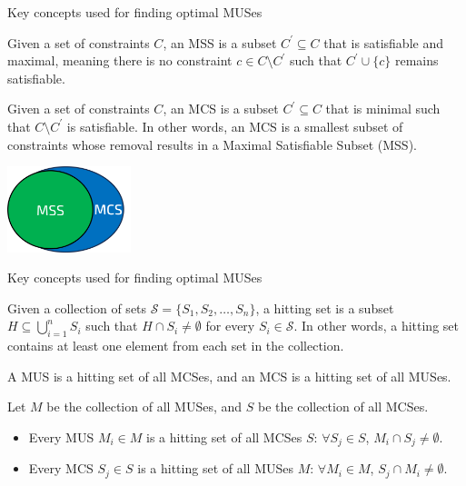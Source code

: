 \documentclass{cons-beamer}
\begin{document}
\begin{frame}{Key concepts used for finding optimal MUSes}

  \begin{definition}
    Given a set of constraints $C$, an MSS is a subset $C^{\prime} \subseteq C$ that is satisfiable and maximal, meaning there is no constraint $c \in C \setminus C^{\prime}$ such that $C^{\prime} \cup \{c\}$ remains satisfiable.
  \end{definition}
  \vfill

  \begin{definition}
    Given a set of constraints $C$, an MCS is a subset $C^{\prime} \subseteq C$ that is minimal such that $C \setminus C^{\prime}$ is satisfiable. In other words, an MCS is a smallest subset of constraints whose removal results in a Maximal Satisfiable Subset (MSS).
  \end{definition}
  \vfill

  \begin{center}
    \includegraphics[height=25mm]{images/texpl_img/mcs.png}
  \end{center}
\end{frame}

\begin{frame}{Key concepts used for finding optimal MUSes}

  \begin{definition}
    Given a collection of sets \( \mathcal{S} = \{S_1, S_2, \dots, S_n\} \), a hitting set is a subset \( H \subseteq \bigcup_{i=1}^n S_i \) such that \( H \cap S_i \neq \emptyset \) for every \( S_i \in \mathcal{S} \). In other words, a hitting set contains at least one element from each set in the collection.
  \end{definition}
  \vfill

  \begin{definition}
    A MUS is a hitting set of all MCSes, and an MCS is a hitting set of all MUSes. 

    Let $M$ be the collection of all MUSes, and $S$ be the collection of all MCSes.

    \begin{itemize}
      \item Every MUS $M_i \in M$ is a hitting set of all MCSes $S$: $\forall S_j \in S$, $M_i \cap S_j \neq \emptyset$.
      \item Every MCS $S_j \in S$ is a hitting set of all MUSes $M$: $\forall M_i \in M$, $S_j \cap M_i \neq \emptyset$.
    \end{itemize}
  \end{definition}
\end{frame}
\end{document}

